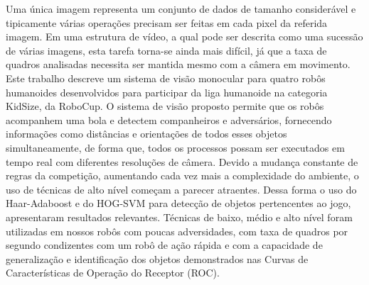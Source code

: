 \documentclass[rascunho]{fei}
\begin{document}
\begin{resumo}

\begin{comment}
Uma única imagem representa um conjunto de dados de tamanho considerável e tipicamente várias operações precisam ser feitas em cada pixel da referida imagem. Em uma estrutura de vídeo, a qual pode ser assimilado como uma sucessão de várias imagens, esta tarefa torna-se ainda mais difícil, já que, a taxa de quadros por segundo necessita ser mantida mesmo com a câmera em movimento. Este trabalho pretende descrever um sistema de visão monocular para quatro robôs humanoides desenvolvidos para participar da liga humanoide na categoria Kid Size, da RoboCup. O sistema de visão proposto permite que os robôs sejam capazes de acompanhar uma bola e detectar companheiros e adversários, fornecendo informações, tais como, distâncias e orientações de todos esses objetos simultaneamente, de forma que, todos os processos possam ser executados em tempo real com diferentes resoluções de câmera. Devido a mudança constante de regras da competição, aumentando cada vez mais a complexidade do ambiente, o uso de técnicas de alto nível, ainda pouco começam a parecer atraentes. Dessa forma o uso do Haar-Adaboost e do HOG-SVM para detecção de objetos pertencentes ao jogo, apresentaram resultados relevantes. Técnicas de baixo, médio e alto nível foram utilizadas em nossos robôs com poucas adversidades, com taxa de quadros por segundo condizentes com um robô de ação rápida e com a capacidade de generalização e identificação dos objetos demonstrados nas Curvas de Características de Operação do Receptor (ROC). 
\end{comment}

Uma única imagem representa um conjunto de dados de tamanho considerável e tipicamente várias operações precisam ser feitas em cada pixel da referida imagem. Em uma estrutura de vídeo, a qual pode ser descrita como uma sucessão de várias imagens, esta tarefa torna-se ainda mais difícil, já que a taxa de quadros analisadas necessita ser mantida mesmo com a câmera em movimento. Este trabalho descreve um sistema de visão monocular para quatro robôs humanoides desenvolvidos para participar da liga humanoide na categoria KidSize, da RoboCup. O sistema de visão proposto permite que os robôs acompanhem uma bola e detectem companheiros e adversários, fornecendo informações  como  distâncias e orientações de todos esses objetos simultaneamente, de forma que, todos os processos possam ser executados em tempo real com diferentes resoluções de câmera. Devido a mudança constante de regras da competição, aumentando cada vez mais a complexidade do ambiente, o uso de técnicas de alto nível começam a parecer atraentes. Dessa forma o uso do Haar-Adaboost e do HOG-SVM para detecção de objetos pertencentes ao jogo, apresentaram resultados relevantes. Técnicas de baixo, médio e alto nível foram utilizadas em nossos robôs com poucas adversidades, com taxa de quadros por segundo condizentes com um robô de ação rápida e com a capacidade de generalização e identificação dos objetos demonstrados nas Curvas de Características de Operação do Receptor (ROC). 


\end{resumo}
\end{document}
